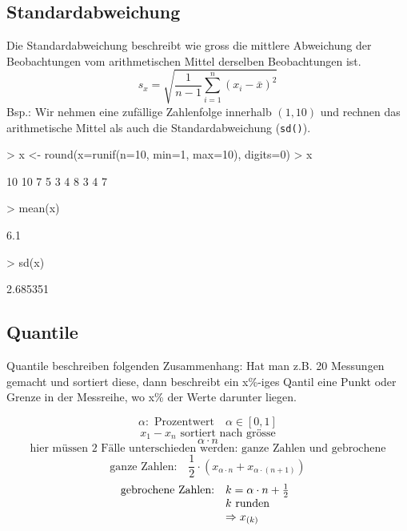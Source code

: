 \subsection{Standardabweichung}
Die Standardabweichung beschreibt wie gross die mittlere Abweichung der
Beobachtungen vom arithmetischen Mittel derselben Beobachtungen ist.
\[ s_x = \sqrt{ \frac{1}{n-1} \sum\limits_{i=1}^{n} (x_i - \bar{x})^2 } \]
Bsp.: Wir nehmen eine zufällige Zahlenfolge innerhalb $(1,10)$ und
rechnen das arithmetische Mittel als auch die Standardabweichung (\verb!sd()!).
\begin{Schunk}
\begin{Sinput}
> x <- round(x=runif(n=10, min=1, max=10), digits=0)
> x
\end{Sinput}
\begin{Soutput}
 [1] 10 10  7  5  3  4  8  3  4  7
\end{Soutput}
\begin{Sinput}
> mean(x)
\end{Sinput}
\begin{Soutput}
[1] 6.1
\end{Soutput}
\begin{Sinput}
> sd(x)
\end{Sinput}
\begin{Soutput}
[1] 2.685351
\end{Soutput}
\end{Schunk}

\subsection{Quantile}
Quantile beschreiben folgenden Zusammenhang: Hat man z.B. 20 Messungen gemacht
und sortiert diese, dann beschreibt ein x\%-iges Qantil eine Punkt oder Grenze
in der Messreihe, wo x\% der Werte darunter liegen.

\[ \alpha: \text{ Prozentwert} \quad \alpha \in [0,1] \]
\[ x_1 - x_n \text{ sortiert nach grösse}  \]
\[ \alpha \cdot n \]
\[ \text{hier müssen 2 Fälle unterschieden werden: ganze Zahlen und gebrochene} \]
\[ \text{ganze Zahlen:} \quad \frac{1}{2} 
\cdot (x_{\alpha \cdot n} + x_{\alpha \cdot (n+1)}) \]
\[ \begin{array}{@{}@{}ll}
	\text{gebrochene Zahlen:} & k=\alpha \cdot n + \frac{1}{2} \\
	                          & k \text{ runden} \\
				  & \Rightarrow x_{(k)}
\end{array}\]

